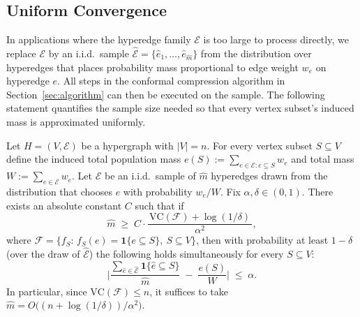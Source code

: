 \subsection{Uniform Convergence}
In applications where the hyperedge family \(\mathcal E\) is too large to process directly, we replace \(\mathcal E\) by an i.i.d.\ sample \(\widehat{\mathcal E}=\{ \widehat e_1,\dots,\widehat e_{\hat{m}}\}\) from the distribution over hyperedges that places probability mass proportional to edge weight \(w_e\) on hyperedge \(e\).  All steps in the conformal compression algorithm in Section~\ref{sec:algorithm} can then be executed on the sample.  The following  statement quantifies the sample size needed so that every vertex subset's induced mass is approximated uniformly.

\begin{lemma}
\label{lem:uniform-sample}
Let \(H=(V,\mathcal E)\) be a hypergraph with \(|V|=n\).  For every
vertex subset \(S\subseteq V\) define the induced total population mass
\(e(S) := \sum_{e\in\mathcal E: e\subseteq S} w_e\) and total mass
\(W:=\sum_{e\in\mathcal E} w_e\).  Let \(\widehat{\mathcal E}\) be an
i.i.d.\ sample of \(\hat{m}\) hyperedges drawn from the distribution that
chooses \(e\) with probability \(w_e/W\).  Fix \(\alpha,\delta\in(0,1)\).
There exists an absolute constant \(C\) such that if
\[
  \hat{m} \;\ge\; C\cdot\frac{\,\mathrm{VC}(\mathcal F) +\log(1/\delta)\,}{\alpha^2},
\]
where \(\mathcal F=\{f_S:\,f_S(e)=\mathbf 1\{e\subseteq S\},\ S\subseteq V\}\),
then with probability at least \(1-\delta\) (over the draw of
\(\widehat{\mathcal E}\)) the following holds simultaneously for every
\(S\subseteq V\):
\[
  \Bigg| \frac{\sum_{\widehat e\in\widehat{\mathcal E}} \mathbf1\{\widehat e\subseteq S\}}{\hat{m}}
         \;-\;
         \frac{e(S)}{W} \Bigg|
  \;\le\; \alpha.
\]
In particular, since \(\mathrm{VC}(\mathcal F)\le n\), it suffices to
take \(\hat{m} = O\!\big((n+\log(1/\delta))/\alpha^2\big)\).
\end{lemma}



